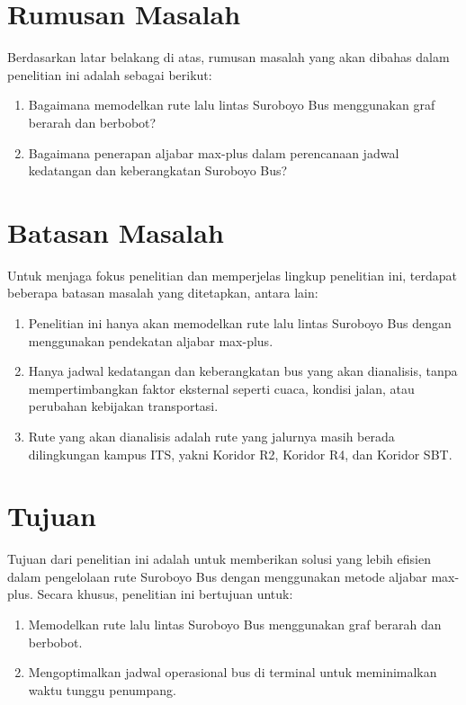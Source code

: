 \documentclass{file/TA-ITS}
\theoremstyle{definition}
\theoremstyle{definition}
\theoremstyle{plain}
\begin{document}
\section{Rumusan Masalah}
Berdasarkan latar belakang di atas, rumusan masalah yang akan dibahas dalam penelitian ini adalah sebagai berikut:

\begin{enumerate}
    \item Bagaimana memodelkan rute lalu lintas Suroboyo Bus menggunakan graf berarah dan berbobot?
    \item Bagaimana penerapan aljabar max-plus dalam perencanaan jadwal kedatangan dan keberangkatan Suroboyo Bus?
\end{enumerate}

\section{Batasan Masalah}
Untuk menjaga fokus penelitian dan memperjelas lingkup penelitian ini, terdapat beberapa batasan masalah yang ditetapkan, antara lain:

\begin{enumerate}
    \item Penelitian ini hanya akan memodelkan rute lalu lintas Suroboyo Bus dengan menggunakan pendekatan aljabar max-plus.
    \item Hanya jadwal kedatangan dan keberangkatan bus yang akan dianalisis, tanpa mempertimbangkan faktor eksternal seperti cuaca, kondisi jalan, atau perubahan kebijakan transportasi.
    \item Rute yang akan dianalisis adalah rute yang jalurnya masih berada dilingkungan kampus ITS, yakni Koridor R2, Koridor R4, dan Koridor SBT.
\end{enumerate}

\section{Tujuan}
Tujuan dari penelitian ini adalah untuk memberikan solusi yang lebih efisien dalam pengelolaan rute Suroboyo Bus dengan menggunakan metode aljabar max-plus. Secara khusus, penelitian ini bertujuan untuk:

\begin{enumerate}
    \item Memodelkan rute lalu lintas Suroboyo Bus menggunakan graf berarah dan berbobot.
    \item Mengoptimalkan jadwal operasional bus di terminal untuk meminimalkan waktu tunggu penumpang.
\end{enumerate}
\end{document}
